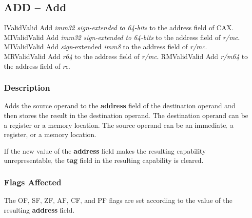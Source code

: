 \clearpage
{}
{}
\subsection*{ADD -- Add}

\begin{x86opcodetable}
  {I}{Valid}{Valid}
  {Add \emph{imm32 sign-extended to 64-bits} to the address field of
    CAX.}
  {MI}{Valid}{Valid}
  {Add \emph{imm32 sign-extended to 64-bits} to the address field of
    \emph{r/mc}.}
  {MI}{Valid}{Valid}
  {Add \emph{sign}-extended \emph{imm8} to the address field of
    \emph{r/mc}.}
  {MR}{Valid}{Valid}
  {Add \emph{r64} to the address field of \emph{r/mc}.}
  {RM}{Valid}{Valid}
  {Add \emph{r/m64} to the address field of \emph{rc}.}
\end{x86opcodetable}

\begin{x86opentable}
\end{x86opentable}

\subsubsection*{Description}

Adds the source operand to the \textbf{address} field of the
destination operand and then stores the result in the destination
operand. The destination operand can be a register or a memory
location. The source operand can be an immediate, a register, or a
memory location.

If the new value of the \textbf{address} field makes the resulting
capability unrepresentable, the \textbf{tag} field in the resulting
capability is cleared.

\subsubsection*{Flags Affected}

The OF, SF, ZF, AF, CF, and PF flags are set according to the value of
the resulting \textbf{address} field.
